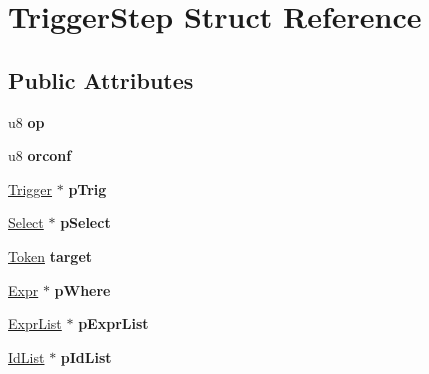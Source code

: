 \hypertarget{struct_trigger_step}{\section{Trigger\-Step Struct Reference}
\label{struct_trigger_step}
}
\subsection*{Public Attributes}
\begin{DoxyCompactItemize}
\item 
\hypertarget{struct_trigger_step_a20269855c80d869d498fcb93401832fd}{u8 {\bfseries op}}\label{struct_trigger_step_a20269855c80d869d498fcb93401832fd}

\item 
\hypertarget{struct_trigger_step_a4ed8b2571fde96e84f637184453e73e3}{u8 {\bfseries orconf}}\label{struct_trigger_step_a4ed8b2571fde96e84f637184453e73e3}

\item 
\hypertarget{struct_trigger_step_a70671e85796776db06c732ab6ae4ae0d}{\hyperlink{struct_trigger}{Trigger} $\ast$ {\bfseries p\-Trig}}\label{struct_trigger_step_a70671e85796776db06c732ab6ae4ae0d}

\item 
\hypertarget{struct_trigger_step_a90bf3353653cedf364a7fb2eb89a19c4}{\hyperlink{struct_select}{Select} $\ast$ {\bfseries p\-Select}}\label{struct_trigger_step_a90bf3353653cedf364a7fb2eb89a19c4}

\item 
\hypertarget{struct_trigger_step_a8b860bb5f466b1522125d446b58d860a}{\hyperlink{struct_token}{Token} {\bfseries target}}\label{struct_trigger_step_a8b860bb5f466b1522125d446b58d860a}

\item 
\hypertarget{struct_trigger_step_ad4c293b04dfda535f3aad5b9e02726c7}{\hyperlink{struct_expr}{Expr} $\ast$ {\bfseries p\-Where}}\label{struct_trigger_step_ad4c293b04dfda535f3aad5b9e02726c7}

\item 
\hypertarget{struct_trigger_step_a607602af65ecf6c7e6cac4ea8532ac1d}{\hyperlink{struct_expr_list}{Expr\-List} $\ast$ {\bfseries p\-Expr\-List}}\label{struct_trigger_step_a607602af65ecf6c7e6cac4ea8532ac1d}

\item 
\hypertarget{struct_trigger_step_a6b91bf578544104f8bd4bd5b958ddd8c}{\hyperlink{struct_id_list}{Id\-List} $\ast$ {\bfseries p\-Id\-List}}\label{struct_trigger_step_a6b91bf578544104f8bd4bd5b958ddd8c}


\end{DoxyCompactItemize}

